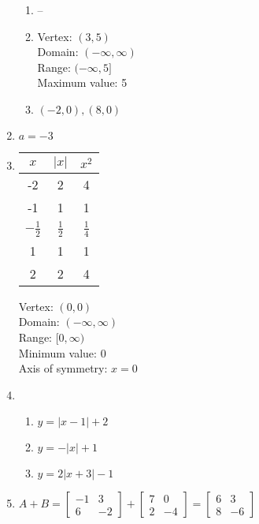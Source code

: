 \documentclass{article}
\begin{document}
\begin{enumerate}
\begin{enumerate}
	\item --
	
	\item Vertex: $(3, 5)$ \\
		Domain: $(-\infty, \infty)$ \\
		Range: $(-\infty, 5]$ \\
		Maximum value: 5
	
	\item $(-2, 0), (8, 0)$
	
	\end{enumerate}
	
\item $a = -3$

\item
	\begin{tabular}{c | c | c}
	$x$ & $|x|$ & $x^2$ \\
	\hline
	-2 & 2 & 4 \\
	-1 & 1 & 1 \\
	$-\frac{1}{2}$ & $\frac{1}{2}$ & $\frac{1}{4}$ \\
	1 & 1 & 1 \\
	2 & 2 & 4
	\end{tabular}
	
	Vertex: $(0, 0)$ \\
	Domain: $(-\infty, \infty)$ \\
	Range: $[0, \infty)$ \\
	Minimum value: 0 \\
	Axis of symmetry: $x = 0$
	
\item
	\begin{enumerate}
	
	\item $y = |x - 1| + 2$
	
	\item $y = -|x| + 1$
	
	\item $y = 2|x + 3| -1$
	
	\end{enumerate}
	
\item $A + B =
	\begin{bmatrix}
	-1 & 3 \\
	6 & -2
	\end{bmatrix} +
	\begin{bmatrix}
	7 & 0 \\
	2 & -4
	\end{bmatrix} =
	\begin{bmatrix}
	6 & 3 \\
	8 & -6
	\end{bmatrix}$ \\
	

\end{enumerate}
\end{document}
